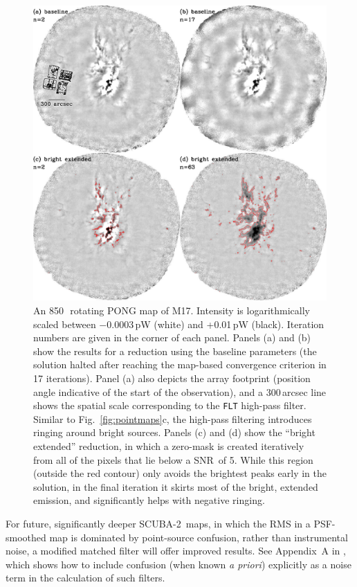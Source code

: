 \documentclass[useAMS,usenatbib,nofootinbib]{mn2e}
\newcommand{\snr}{SNR}
\newcommand{\scuba}{SCUBA-2}
\newcommand{\model}[1]{\texttt{#1}}
\begin{document}
\begin{figure}
\centering
\includegraphics[width=\linewidth]{m17}
\caption{An 850\,\micron\ rotating PONG map of M17. Intensity is
logarithmically scaled between $-$0.0003\,pW (white) and +0.01\,pW
(black). Iteration numbers are given in the corner of each
panel. Panels (a) and (b) show the results for a reduction using the
baseline parameters (the solution halted after reaching the map-based
convergence criterion in 17 iterations). Panel (a) also depicts the
array footprint (position angle indicative of the start of the
observation), and a 300\,arcsec line shows the spatial scale
corresponding to the \model{FLT} high-pass filter. Similar to
Fig.~\ref{fig:pointmaps}c, the high-pass filtering introduces ringing
around bright sources. Panels (c) and (d) show the ``bright extended''
reduction, in which a zero-mask is created iteratively from all of the
pixels that lie below a \snr\ of 5. While this region (outside the red
contour) only avoids the brightest peaks early in the solution, in the
final iteration it skirts most of the bright, extended emission, and
significantly helps with negative ringing.}
\label{fig:m17}
\end{figure}

For future, significantly deeper \scuba\ maps, in which the RMS in a
PSF-smoothed map is dominated by point-source confusion, rather than
instrumental noise, a modified matched filter will offer improved
results. See Appendix~A in \citet{chapin2011}, which shows how to
include confusion (when known \emph{a priori}) explicitly as a noise
term in the calculation of such filters.
\end{document}
